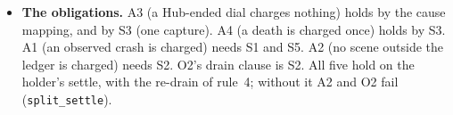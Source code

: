\documentclass[a4paper,10pt,fleqn]{article}
\begin{document}
\begin{itemize}
    superset of the abstract one, and the relation that holds is
    \emph{concrete charges $\subseteq$ abstract charges}.  The inclusion gives A2.
    A1 holds for a different reason: the only acknowledgements the concrete
    settle reads beyond the abstract ones are, by T11, of scenes that survived a
    frame, so the poison scene is never among them.  The abstract model charges
    a scene that the concrete one does not only when a display recorded
    unresponsive later swaps and acknowledges that scene, and such a scene was
    not poison.
  \item \textbf{The obligations.}  A3 (a Hub-ended dial charges nothing) holds by
    the cause mapping, and by S3 (one capture).  A4 (a death is charged once)
    holds by S3.  A1 (an observed crash is charged) needs S1 and S5.  A2 (no
    scene outside the ledger is charged) needs S2.  O2's drain clause is S2.  All
    five hold on the holder's settle, with the re-drain of rule~4; without it A2
    and O2 fail (\texttt{split\_settle}).
\end{itemize}
\end{document}
